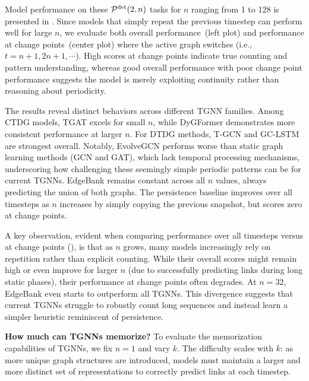 Model performance on these $\mathcal{P}^\text{det}(2,n)$ tasks for $n$ ranging from 1 to 128 is presented in . 
Since models that simply repeat the previous timestep can perform well for large $n$, we evaluate both overall performance~(left plot) and performance at change points~(center plot) where the active graph switches (i.e., $t = n+1, 2n+1, \cdots$). High scores at change points indicate true counting and pattern understanding, whereas good overall performance with poor change point performance suggests the model is merely exploiting continuity rather than reasoning about periodicity.


 The results reveal distinct behaviors across different TGNN families. Among CTDG models, TGAT excels for small $n$, while DyGFormer demonstrates more consistent performance at larger $n$. For DTDG methods, T-GCN and GC-LSTM are strongest overall. Notably, EvolveGCN performs worse than static graph learning methods (GCN and GAT), which lack temporal processing mechanisms, underscoring how challenging these seemingly simple periodic patterns can be for current TGNNs. EdgeBank remains constant across all $n$ values, always predicting the union of both graphs. The persistence baseline improves over all timesteps as $n$ increases by simply copying the previous snapshot, but scores zero at change points.

 A key observation, evident when comparing performance over all timesteps versus at change points (), is that as $n$ grows, many models increasingly rely on repetition rather than explicit counting. While their overall scores might remain high or even improve for larger $n$ (due to successfully predicting links during long static phases), their performance at change points often degrades. At $n = 32$, EdgeBank even starts to outperform all TGNNs. This divergence suggests that current TGNNs struggle to robustly count long sequences and instead learn a simpler heuristic reminiscent of persistence. %

 \textbf{How much can TGNNs memorize?} To evaluate the memorization capabilities of TGNNs, we fix $n = 1$ and vary $k$. The difficulty scales with $k$: as more unique graph structures are introduced, models must maintain a larger and more distinct set of representations to correctly predict links at each timestep. \label{seq:memorize}

